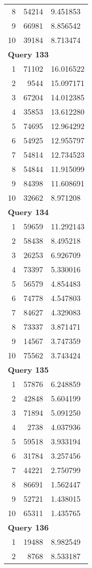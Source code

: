 \begin{longtable}[{p}]{@{}rrp{}@{}}
8 & 54214 & 9.451853 \\
9 & 66981 & 8.856542 \\
10 & 39184 & 8.713474 \\
\midrule
\multicolumn{3}{l}{\bfseries Query 133} \\
1 & 71102 & 16.016522 \\
2 & 9544 & 15.097171 \\
3 & 67204 & 14.012385 \\
4 & 35853 & 13.612280 \\
5 & 74695 & 12.964292 \\
6 & 54925 & 12.955797 \\
7 & 54814 & 12.734523 \\
8 & 54844 & 11.915099 \\
9 & 84398 & 11.608691 \\
10 & 32662 & 8.971208 \\
\midrule
\multicolumn{3}{l}{\bfseries Query 134} \\
1 & 59659 & 11.292143 \\
2 & 58438 & 8.495218 \\
3 & 26253 & 6.926709 \\
4 & 73397 & 5.330016 \\
5 & 56579 & 4.854483 \\
6 & 74778 & 4.547803 \\
7 & 84627 & 4.329083 \\
8 & 73337 & 3.871471 \\
9 & 14567 & 3.747359 \\
10 & 75562 & 3.743424 \\
\midrule
\multicolumn{3}{l}{\bfseries Query 135} \\
1 & 57876 & 6.248859 \\
2 & 42848 & 5.604199 \\
3 & 71894 & 5.091250 \\
4 & 2738 & 4.037936 \\
5 & 59518 & 3.933194 \\
6 & 31784 & 3.257456 \\
7 & 44221 & 2.750799 \\
8 & 86691 & 1.562447 \\
9 & 52721 & 1.438015 \\
10 & 65311 & 1.435765 \\
\midrule
\multicolumn{3}{l}{\bfseries Query 136} \\
1 & 19488 & 8.982549 \\
2 & 8768 & 8.533187 \\

\end{longtable}
